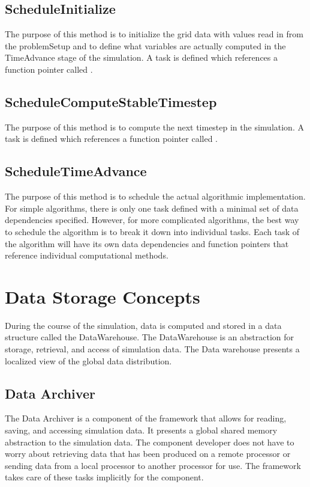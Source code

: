 \subsection{ScheduleInitialize}

The purpose of this method is to initialize the grid data with values
read in from the problemSetup and to define what variables are
actually computed in the TimeAdvance stage of the simulation.  A task
is defined which references a function pointer called
.

\subsection{ScheduleComputeStableTimestep}

The purpose of this method is to compute the next timestep in the
simulation.  A task is defined which references a function pointer
called .

\subsection{ScheduleTimeAdvance}

The purpose of this method is to schedule the actual algorithmic
implementation.  For simple algorithms, there is only one task defined
with a minimal set of data dependencies specified.  However, for more
complicated algorithms, the best way to schedule the algorithm is to
break it down into individual tasks.  Each task of the algorithm will
have its own data dependencies and function pointers that reference
individual computational methods.

\section{Data Storage Concepts}

During the course of the simulation, data is computed and stored in a
data structure called the DataWarehouse.  The DataWarehouse is an abstraction
for storage, retrieval, and access of \Vaango simulation data. The Data warehouse 
presents a localized view of the global data distribution.  

\subsection{Data Archiver}

The Data Archiver is a component of the framework that allows for reading, saving, 
and accessing simulation data. 
It presents a global shared memory abstraction to the simulation data. The component 
developer does not have 
to worry about retrieving data that has been produced on a remote processor or 
sending data from a local processor 
to another processor for use. The framework takes care of these tasks implicitly 
for the component. 

